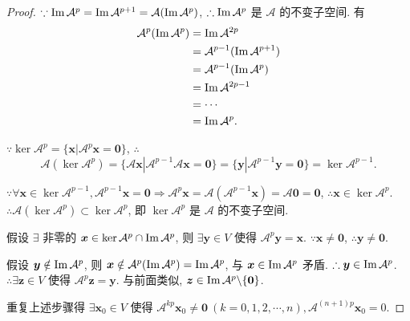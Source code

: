 \documentclass[color=black,device=normal,lang=cn,mode=geye]{elegantnote}
\begin{document}
\begin{proof}
    $\because\operatorname{Im} \mathcal{A}^p=\operatorname{Im} \mathcal{A}^{p+1}=\mathcal{A}(\operatorname{Im} \mathcal{A}^p)$, $\therefore\operatorname{Im} \mathcal{A}^p$ 是 $\mathcal{A}$ 的不变子空间. 有
    \begin{align*}
        \mathcal{A}^p(\operatorname{Im} \mathcal{A}^p) & =\operatorname{Im} \mathcal{A}^{2p} \\
        & =\mathcal{A}^{p-1}(\operatorname{Im} \mathcal{A}^{p+1}) \\
        & =\mathcal{A}^{p-1}(\operatorname{Im} \mathcal{A}^p) \\
        & =\operatorname{Im} \mathcal{A}^{2p-1} \\
        & =\cdots \\
        & =\operatorname{Im} \mathcal{A}^p.
    \end{align*}

    $\because\ker\mathcal{A}^p=\{\boldsymbol{x}|\mathcal{A}^p\boldsymbol{x}=\boldsymbol{0}\}$, $\therefore$
    \begin{equation}\label{ex3.3eq}
        \mathcal{A}(\ker\mathcal{A}^p)=\{\mathcal{A}\boldsymbol{x}|\mathcal{A}^{p-1}\mathcal{A}\boldsymbol{x}=\boldsymbol{0}\}=\{\boldsymbol{y}|\mathcal{A}^{p-1}\boldsymbol{y}=\boldsymbol{0}\}=\ker\mathcal{A}^{p-1}.
    \end{equation}

    $\because\forall\boldsymbol{x}\in\ker\mathcal{A}^{p-1},\mathcal{A}^{p-1}\boldsymbol{x}=\boldsymbol{0}\Rightarrow\mathcal{A}^p\boldsymbol{x}=\mathcal{A}(\mathcal{A}^{p-1}\boldsymbol{x})=\mathcal{A}\boldsymbol{0}=\boldsymbol{0}$, $\therefore\boldsymbol{x}\in\ker\mathcal{A}^p$. $\therefore\mathcal{A}(\ker\mathcal{A}^p)\subset\ker\mathcal{A}^p$, 即 $\ker\mathcal{A}^p$ 是 $\mathcal{A}$ 的不变子空间.

    假设 $\exists$ 非零的 $\boldsymbol{x}\in\ker\mathcal{A}^p\cap\operatorname{Im} \mathcal{A}^p$, 则 $\exists\boldsymbol{y}\in V$ 使得 $\mathcal{A}^p\boldsymbol{y}=\boldsymbol{x}$. $\because\boldsymbol{x}\neq\boldsymbol{0}$, $\therefore\boldsymbol{y}\neq\boldsymbol{0}$.

    假设 $\boldsymbol{y}\notin\operatorname{Im} \mathcal{A}^p$, 则 $\boldsymbol{x}\notin\mathcal{A}^p(\operatorname{Im} \mathcal{A}^p)=\operatorname{Im} \mathcal{A}^p$, 与 $\boldsymbol{x}\in\operatorname{Im} \mathcal{A}^p$ 矛盾. $\therefore\boldsymbol{y}\in\operatorname{Im} \mathcal{A}^p$. $\therefore\exists\boldsymbol{z}\in V$ 使得 $\mathcal{A}^p\boldsymbol{z}=\boldsymbol{y}$. 与前面类似, $\boldsymbol{z}\in\operatorname{Im} \mathcal{A}^p\backslash\{\boldsymbol{0}\}$.

    重复上述步骤得 $\exists\boldsymbol{x}_0\in V$ 使得 $\mathcal{A}^{kp}\boldsymbol{x}_0\neq\boldsymbol{0}\ (k=0,1,2,\cdots,n),\mathcal{A}^{(n+1)p}\boldsymbol{x}_0=0$.


\end{proof}
\end{document}
